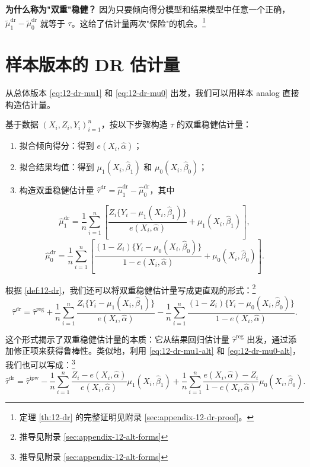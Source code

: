 \textbf{为什么称为"双重"稳健？} 因为只要倾向得分模型和结果模型中任意一个正确，$\tilde\mu_1^{\mathrm{dr}} - \tilde\mu_0^{\mathrm{dr}}$ 就等于 $\tau$。这给了估计量两次"保险"的机会。\footnote{定理 \cref{th:12-dr} 的完整证明见附录 \cref{sec:appendix-12-dr-proof}。}

\section{样本版本的 DR 估计量}\label{sec:12-sample}

从总体版本 \cref{eq:12-dr-mu1} 和 \cref{eq:12-dr-mu0} 出发，我们可以用样本 analog 直接构造估计量。

\begin{Definition}[平均因果效应的双重稳健估计量]\label{def:12-dr}
基于数据 $(X_i, Z_i, Y_i)_{i=1}^n$，按以下步骤构造 $\tau$ 的双重稳健估计量：
\begin{enumerate}
  \item 拟合倾向得分：得到 $e(X_i, \hat\alpha)$；
  \item 拟合结果均值：得到 $\mu_1(X_i, \hat\beta_1)$ 和 $\mu_0(X_i, \hat\beta_0)$；
  \item 构造双重稳健估计量 $\hat\tau^{\mathrm{dr}} = \hat\mu_1^{\mathrm{dr}} - \hat\mu_0^{\mathrm{dr}}$，其中
\end{enumerate}
\[
\hat\mu_1^{\mathrm{dr}} = \frac{1}{n}\sum_{i=1}^n\left[\frac{Z_i\{Y_i - \mu_1(X_i, \hat\beta_1)\}}{e(X_i, \hat\alpha)} + \mu_1(X_i, \hat\beta_1)\right],
\]
\[
\hat\mu_0^{\mathrm{dr}} = \frac{1}{n}\sum_{i=1}^n\left[\frac{(1-Z_i)\{Y_i - \mu_0(X_i, \hat\beta_0)\}}{1-e(X_i, \hat\alpha)} + \mu_0(X_i, \hat\beta_0)\right].
\]
\end{Definition}

根据 \cref{def:12-dr}，我们还可以将双重稳健估计量写成更直观的形式：\footnote{推导见附录 \cref{sec:appendix-12-alt-forms}}
\[
\hat\tau^{\mathrm{dr}} = \hat\tau^{\mathrm{reg}} + \frac{1}{n}\sum_{i=1}^n\frac{Z_i\{Y_i - \mu_1(X_i, \hat\beta_1)\}}{e(X_i, \hat\alpha)} - \frac{1}{n}\sum_{i=1}^n\frac{(1-Z_i)\{Y_i - \mu_0(X_i, \hat\beta_0)\}}{1-e(X_i, \hat\alpha)}.
\label{eq:12-dr-reg-aug}
\]

这个形式揭示了双重稳健估计量的本质：它从结果回归估计量 $\hat\tau^{\mathrm{reg}}$ 出发，通过添加修正项来获得鲁棒性。类似地，利用 \cref{eq:12-dr-mu1-alt} 和 \cref{eq:12-dr-mu0-alt}，我们也可以写成：\footnote{推导见附录 \cref{sec:appendix-12-alt-forms}}
\[
\hat\tau^{\mathrm{dr}} = \hat\tau^{\mathrm{ipw}} - \frac{1}{n}\sum_{i=1}^n\frac{Z_i - e(X_i, \hat\alpha)}{e(X_i, \hat\alpha)}\mu_1(X_i, \hat\beta_1) + \frac{1}{n}\sum_{i=1}^n\frac{e(X_i, \hat\alpha) - Z_i}{1-e(X_i, \hat\alpha)}\mu_0(X_i, \hat\beta_0).
\label{eq:12-dr-ipw-aug}
\]

